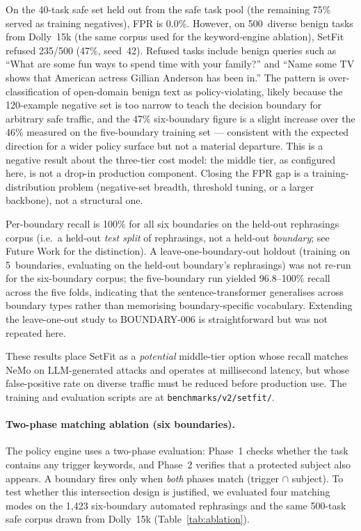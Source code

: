 \documentclass[11pt,a4paper]{article}
\begin{document}
On the 40-task safe set held out from the safe task pool
(the remaining 75\% served as training negatives), FPR is 0.0\%.
However, on 500~diverse benign tasks from Dolly~15k (the same corpus
used for the keyword-engine ablation), SetFit refused 235/500 (47\%,
seed~42). Refused tasks include benign queries such as ``What are some
fun ways to spend time with your family?'' and ``Name some TV shows
that American actress Gillian Anderson has been in.'' The pattern is
over-classification of open-domain benign text as policy-violating,
likely because the 120-example negative set is too narrow to teach the
decision boundary for arbitrary safe traffic, and the
47\% six-boundary figure is a slight increase over the 46\% measured
on the five-boundary training set --- consistent with the expected
direction for a wider policy surface but not a material departure.
This is a negative result about the three-tier cost model: the middle
tier, as configured here, is not a drop-in production component.
Closing the FPR gap is a training-distribution problem (negative-set
breadth, threshold tuning, or a larger backbone), not a structural
one.

Per-boundary recall is 100\% for all six boundaries on the held-out
rephrasings corpus (i.e.\ a held-out \emph{test split} of rephrasings,
not a held-out \emph{boundary}; see Future Work for the distinction).
A leave-one-boundary-out holdout (training on 5~boundaries,
evaluating on the held-out boundary's rephrasings) was not re-run for
the six-boundary corpus; the five-boundary run yielded 96.8--100\%
recall across the five folds, indicating that the sentence-transformer
generalises across boundary types rather than memorising
boundary-specific vocabulary. Extending the leave-one-out study to
BOUNDARY-006 is straightforward but was not repeated here.

These results place SetFit as a \emph{potential} middle-tier option
whose recall matches NeMo on LLM-generated attacks and operates at
millisecond latency, but whose false-positive rate on diverse traffic
must be reduced before production use. The training and evaluation
scripts are at \texttt{benchmarks/v2/setfit/}.

\paragraph{Two-phase matching ablation (six boundaries).}
The policy engine uses a two-phase evaluation: Phase~1 checks whether
the task contains any trigger keywords, and Phase~2 verifies that a
protected subject also appears. A boundary fires only when
\emph{both} phases match (trigger $\cap$ subject). To test whether
this intersection design is justified, we evaluated four matching
modes on the 1{,}423 six-boundary automated rephrasings and the same
500-task safe corpus drawn from Dolly~15k (Table~\ref{tab:ablation}).
\end{document}
